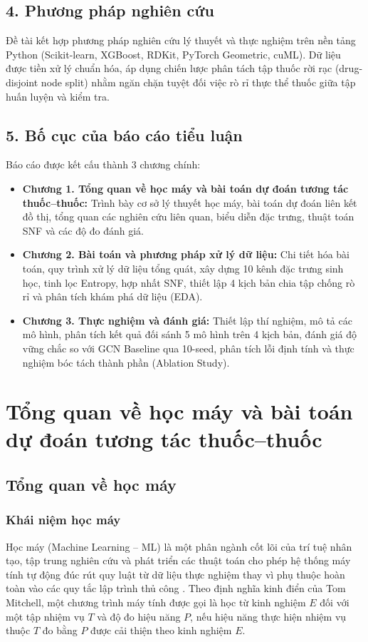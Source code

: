 \documentclass[12pt,a4paper,oneside]{report}
\newcommand{\tenbaitoan}{dự đoán tương tác thuốc--thuốc}
\begin{document}
\section*{4. Phương pháp nghiên cứu}
Đề tài kết hợp phương pháp nghiên cứu lý thuyết và thực nghiệm trên nền tảng Python (Scikit-learn, XGBoost, RDKit, PyTorch Geometric, cuML). Dữ liệu được tiền xử lý chuẩn hóa, áp dụng chiến lược phân tách tập thuốc rời rạc (drug-disjoint node split) nhằm ngăn chặn tuyệt đối việc rò rỉ thực thể thuốc giữa tập huấn luyện và kiểm tra.

\section*{5. Bố cục của báo cáo tiểu luận}
Báo cáo được kết cấu thành 3 chương chính:
\begin{itemize}
  \item \textbf{Chương 1. Tổng quan về học máy và bài toán \tenbaitoan:} Trình bày cơ sở lý thuyết học máy, bài toán dự đoán liên kết đồ thị, tổng quan các nghiên cứu liên quan, biểu diễn đặc trưng, thuật toán SNF và các độ đo đánh giá.
  \item \textbf{Chương 2. Bài toán và phương pháp xử lý dữ liệu:} Chi tiết hóa bài toán, quy trình xử lý dữ liệu tổng quát, xây dựng 10 kênh đặc trưng sinh học, tinh lọc Entropy, hợp nhất SNF, thiết lập 4 kịch bản chia tập chống rò rỉ và phân tích khám phá dữ liệu (EDA).
  \item \textbf{Chương 3. Thực nghiệm và đánh giá:} Thiết lập thí nghiệm, mô tả các mô hình, phân tích kết quả đối sánh 5 mô hình trên 4 kịch bản, đánh giá độ vững chắc so với GCN Baseline qua 10-seed, phân tích lỗi định tính và thực nghiệm bóc tách thành phần (Ablation Study).
\end{itemize}

\chapter{Tổng quan về học máy và bài toán \tenbaitoan}
\label{chap:tongquan}

\section{Tổng quan về học máy}

\subsection{Khái niệm học máy}
Học máy (Machine Learning -- ML) là một phân ngành cốt lõi của trí tuệ nhân tạo, tập trung nghiên cứu và phát triển các thuật toán cho phép hệ thống máy tính tự động đúc rút quy luật từ dữ liệu thực nghiệm thay vì phụ thuộc hoàn toàn vào các quy tắc lập trình thủ công \cite{mitchell1997}. Theo định nghĩa kinh điển của Tom Mitchell, một chương trình máy tính được gọi là học từ kinh nghiệm $E$ đối với một tập nhiệm vụ $T$ và độ đo hiệu năng $P$, nếu hiệu năng thực hiện nhiệm vụ thuộc $T$ đo bằng $P$ được cải thiện theo kinh nghiệm $E$.
\end{document}
